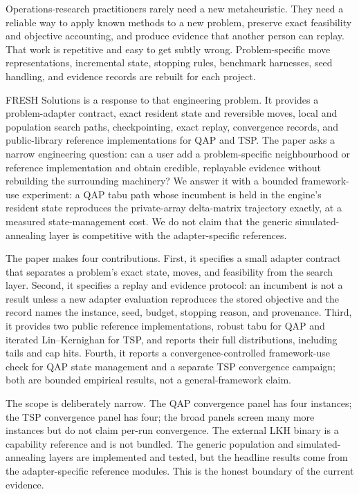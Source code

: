 \documentclass[pdflatex,sn-mathphys-num]{sn-jnl}
\begin{document}
Operations-research practitioners rarely need a new metaheuristic. They need a reliable way to apply
known methods to a new problem, preserve exact feasibility and objective accounting, and produce
evidence that another person can replay. That work is repetitive and easy to get subtly wrong.
Problem-specific move representations, incremental state, stopping rules, benchmark harnesses, seed
handling, and evidence records are rebuilt for each project.

FRESH Solutions is a response to that engineering problem. It provides a problem-adapter contract,
exact resident state and reversible moves, local and population search paths, checkpointing, exact
replay, convergence records, and public-library reference implementations for QAP and TSP. The paper
asks a narrow engineering question: can a user add a problem-specific neighbourhood or reference
implementation and obtain credible, replayable evidence without rebuilding the surrounding machinery?
We answer it with a bounded framework-use experiment: a QAP tabu path whose incumbent is held in the
engine's resident state reproduces the private-array delta-matrix trajectory exactly, at a measured
state-management cost. We do not claim that the generic simulated-annealing layer is competitive with
the adapter-specific references.

The paper makes four contributions. First, it specifies a small adapter contract that separates a
problem's exact state, moves, and feasibility from the search layer. Second, it specifies a replay and
evidence protocol: an incumbent is not a result unless a new adapter evaluation reproduces the
stored objective and the record names the instance, seed, budget, stopping reason, and provenance.
Third, it provides two public reference implementations, robust tabu for QAP and iterated
Lin--Kernighan for TSP, and reports their full distributions, including tails and cap hits. Fourth, it
reports a convergence-controlled framework-use check for QAP state management and a separate TSP
convergence campaign; both are bounded empirical results, not a general-framework claim.

The scope is deliberately narrow. The QAP convergence panel has four instances; the TSP convergence
panel has four; the broad panels screen many more instances but do not claim per-run convergence. The
external LKH binary is a capability reference and is not bundled. The generic population and
simulated-annealing layers are implemented and tested, but the headline results come from the
adapter-specific reference modules. This is the honest boundary of the current evidence.
\end{document}
